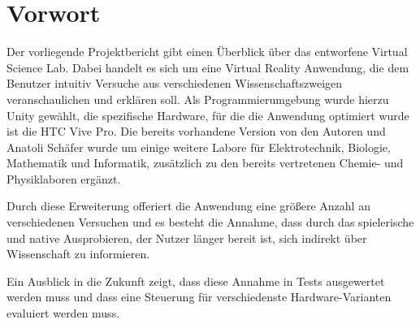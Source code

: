 \chapter*{Vorwort}

Der vorliegende Projektbericht gibt einen Überblick über das entworfene Virtual Science Lab. Dabei handelt es sich um eine Virtual Reality Anwendung, die dem Benutzer intuitiv Versuche aus verschiedenen Wissenschaftszweigen veranschaulichen und erklären soll. Als Programmierumgebung wurde hierzu Unity gewählt, die spezifische Hardware, für die die Anwendung optimiert wurde ist die HTC Vive Pro. Die bereits vorhandene Version von den Autoren und Anatoli Schäfer wurde um einige weitere Labore für Elektrotechnik, Biologie, Mathematik und Informatik, zusätzlich zu den bereits vertretenen Chemie- und Physiklaboren ergänzt.

Durch diese Erweiterung offeriert die Anwendung eine größere Anzahl an verschiedenen Versuchen und es besteht die Annahme, dass durch das spielerische und native Ausprobieren, der Nutzer länger bereit ist, sich indirekt über Wissenschaft zu informieren. 

Ein Ausblick in die Zukunft zeigt, dass diese Annahme in Tests ausgewertet werden muss und dass eine Steuerung für verschiedenste Hardware-Varianten evaluiert werden muss. 